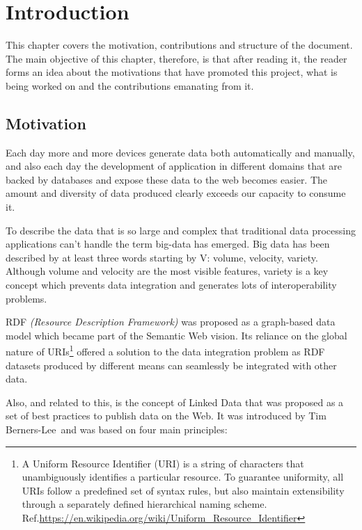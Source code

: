 \chapter{Introduction}
\label{ch:intro}

This chapter covers the motivation, contributions and structure of the document.
The main objective of this chapter, therefore, is that after reading it, the reader
forms an idea about the motivations that have promoted this project, what is
being worked on and the contributions emanating from it.


\section{Motivation}
\label{sec:intro-motiv}

Each day more and more devices generate data both automatically and manually, and also each day the development of
application in different domains that are backed by databases and expose these data to the web becomes easier. The
amount and diversity of data produced clearly exceeds our capacity to consume it.

To describe the data that is so large and complex that traditional data processing applications can’t handle the
term big-data \cite{big-data,sagiroglu2013big} has emerged. Big data has been described by at least three words starting
by V: volume, velocity, variety. Although volume and velocity are the most visible features, variety is a key concept
which prevents data integration and generates lots of interoperability problems.

RDF \textit{(Resource Description Framework)} was proposed as a graph-based data model
\cite{graph-data-model} which became part of the Semantic Web \cite{semantic-web} vision.
Its reliance on the global nature of URIs\footnote{A Uniform Resource Identifier (URI) is a string of
characters that unambiguously identifies a particular resource. To guarantee uniformity, all URIs follow a predefined
set of syntax rules, but also maintain extensibility through a separately defined hierarchical naming scheme.
Ref.\url{https://en.wikipedia.org/wiki/Uniform_Resource_Identifier}} offered a solution to the data integration
problem as RDF datasets produced by different means can seamlessly be integrated with other data.

Also, and related to this, is the concept of Linked Data \cite{linked-data} that was proposed as a set of best
practices to publish data on the Web. It was introduced by Tim Berners-Lee and was based on four main principles:

